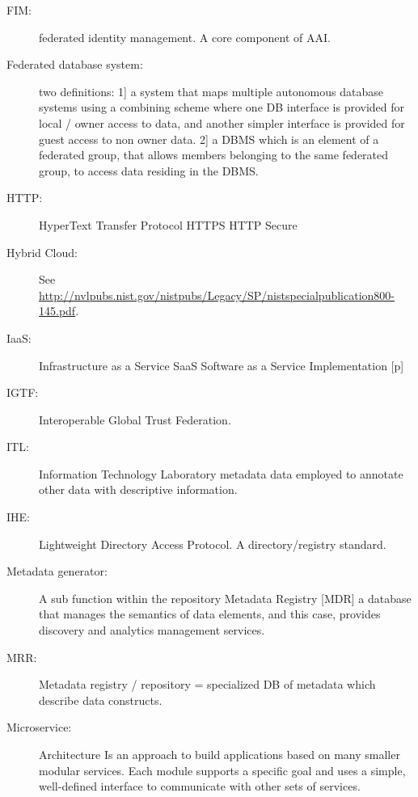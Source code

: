 \begin{description}
\item[FIM:]	   federated identity management. A core component of AAI.  


\item[Federated database system:]	two definitions: 1] a system that maps multiple autonomous database systems using a combining scheme where one DB interface is provided for local / owner access to data, and another simpler interface is provided for guest access to non owner data. 2] a DBMS which is an element of a federated group, that allows members belonging to the same federated group, to access data residing in the DBMS. 

\item[HTTP:]	HyperText Transfer Protocol HTTPS HTTP Secure

\item[Hybrid Cloud:] 	See \url{http://nvlpubs.nist.gov/nistpubs/Legacy/SP/nistspecialpublication800-145.pdf}.


\item[IaaS:]	Infrastructure as a Service SaaS Software as a Service Implementation [p] 

\item[IGTF:]   Interoperable Global Trust Federation.

\item[ITL:]	Information Technology Laboratory
metadata	data employed to annotate other data with descriptive information. 

\item[IHE:} \TODO{russel}{TBD}

\item[LDAP:]   Lightweight Directory Access Protocol. A directory/registry standard. 

\item[Metadata generator:]	A sub function within the repository
Metadata Registry [MDR]	a database that manages the semantics of data elements, and this case, provides discovery and analytics management services. 

\item[MRR:] 	Metadata registry / repository = specialized DB of metadata which describe data constructs.

\item[Microservice:] Architecture	Is an approach to build applications based on many smaller modular services. Each module supports a specific goal and uses a simple, well-defined interface to communicate with other sets of services.


\end{description}
